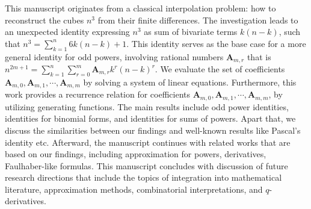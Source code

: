 This manuscript originates from a classical interpolation problem: how to reconstruct the cubes $n^3$
from their finite differences.
The investigation leads to an unexpected identity expressing $n^3$ as sum of bivariate terms $k(n-k)$,
such that $n^3=\sum_{k=1}^{n} 6k(n-k) + 1$.
This identity serves as the base case for a more general identity for odd powers,
involving rational numbers $\mathbf{A}_{m,r}$ that is
$n^{2m+1} = \sum_{k=1}^{n} \sum_{r=0}^{m} \mathbf{A}_{m,r} k^r (n-k)^r$.
We evaluate the set of coefficients $\mathbf{A}_{m,0}, \mathbf{A}_{m,1}, \cdots, \mathbf{A}_{m,m}$
by solving a system of linear equations.
Furthermore, this work provides a recurrence relation
for coefficients $\mathbf{A}_{m,0}, \mathbf{A}_{m,1}, \cdots, \mathbf{A}_{m,m}$, by utilizing
generating functions.
The main results include odd power identities, identities for binomial forms,
and identities for sums of powers.
Apart that, we discuss the similarities between our findings and well-known results like Pascal's identity etc.
Afterward, the manuscript continues with related works that are based on our findings,
including approximation for powers,
derivatives, Faulhaber-like formulas.
This manuscript concludes with discussion of future research directions that include
the topics of integration into mathematical literature, approximation methods, combinatorial interpretations,
and $q$-derivatives.
